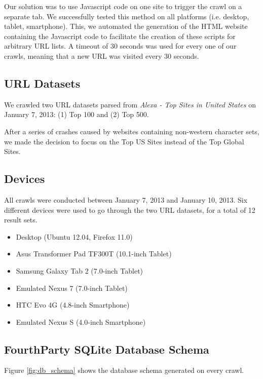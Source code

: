 \documentclass{acm_proc_article-sp}
\begin{document}
Our solution was to use Javascript code on one site to trigger the crawl on a separate tab. We successfully tested this method on all platforms (i.e. desktop, tablet, smartphone). This, we automated the generation of the HTML website containing the Javascript code to facilitate the creation of these scripts for arbitrary URL lists. A timeout of 30 seconds was used for every one of our crawls, meaning that a new URL was visited every 30 seconds.

\subsection{URL Datasets}

We crawled two URL datasets parsed from \emph{Alexa - Top Sites in United States} on January 7, 2013: (1) Top 100 and (2) Top 500.

After a series of crashes caused by websites containing non-western character sets, we made the decision to focus on the Top US Sites instead of the Top Global Sites.

\subsection{Devices}

All crawls were conducted between January 7, 2013 and January 10, 2013. Six different devices were used to go through the two URL datasets, for a total of 12 result sets.

\begin{itemize}
\item Desktop (Ubuntu 12.04, Firefox 11.0)

\item Asus Transformer Pad TF300T (10.1-inch Tablet)

\item Samsung Galaxy Tab 2 (7.0-inch Tablet)

\item Emulated Nexus 7 (7.0-inch Tablet)

\item HTC Evo 4G (4.8-inch Smartphone)

\item Emulated Nexus S (4.0-inch Smartphone)
\end{itemize}

\subsection{FourthParty SQLite Database Schema}
Figure \ref{fig:db_schema} shows the database schema generated on every crawl.
\end{document}
